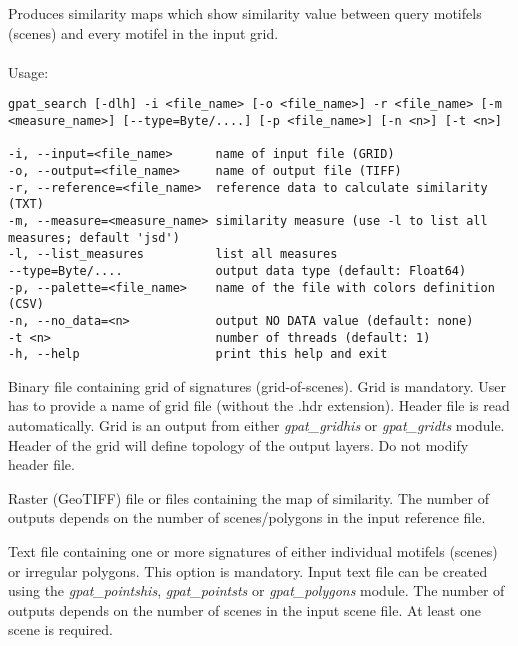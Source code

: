 Produces similarity maps which show similarity value between query motifels (scenes) and every motifel in the input grid.
\\\\
Usage:

\begin{minipage}{\linewidth}
\begin{lstlisting}
gpat_search [-dlh] -i <file_name> [-o <file_name>] -r <file_name> [-m <measure_name>] [--type=Byte/....] [-p <file_name>] [-n <n>] [-t <n>]

-i, --input=<file_name>      name of input file (GRID)
-o, --output=<file_name>     name of output file (TIFF)
-r, --reference=<file_name>  reference data to calculate similarity (TXT)
-m, --measure=<measure_name> similarity measure (use -l to list all measures; default 'jsd')
-l, --list_measures          list all measures
--type=Byte/....             output data type (default: Float64)
-p, --palette=<file_name>    name of the file with colors definition (CSV)
-n, --no_data=<n>            output NO DATA value (default: none)
-t <n>                       number of threads (default: 1)
-h, --help                   print this help and exit
\end{lstlisting}
\end{minipage}


Binary file containing grid of signatures (grid-of-scenes). 
Grid is mandatory. 
User has to provide a name of grid file (without the .hdr extension). 
Header file is read automatically. 
Grid is an output from either {\it gpat\_gridhis} or {\it gpat\_gridts} module. 
Header of the grid will define topology of the output layers. 
Do not modify header file.


Raster (GeoTIFF) file or files containing the map of similarity. 
The number of outputs depends on the number of scenes/polygons in the input reference file. 


Text file containing one or more signatures of either individual motifels (scenes) or irregular polygons. 
This option is mandatory. 
Input text file can be created using the {\it gpat\_pointshis}, {\it gpat\_pointsts} or {\it gpat\_polygons} module. 
The number of outputs depends on the number of scenes in the input scene file. 
At least one scene is required. 

